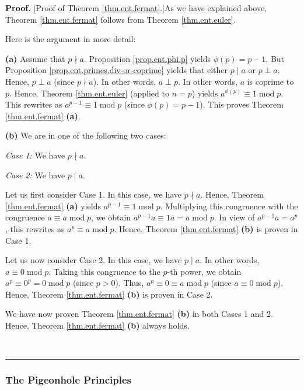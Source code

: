 \documentclass[numbers=enddot,12pt,final,onecolumn,notitlepage]{scrartcl}%
\numberwithin{exer}{subsection}
\theoremstyle{definition}
\newenvironment{fineprint}{\begin{small}}{\end{small}}
\newenvironment{proof}[1][Proof]{\noindent\textbf{#1.} }{\ \rule{0.5em}{0.5em}}
\begin{document}
\begin{proof}
[Proof of Theorem \ref{thm.ent.fermat}.]As we have explained above, Theorem
\ref{thm.ent.fermat} follows from Theorem \ref{thm.ent.euler}.

\begin{fineprint}
Here is the argument in more detail:

\textbf{(a)} Assume that $p\nmid a$. Proposition \ref{prop.ent.phi.p} yields
$\phi\left(  p\right)  =p-1$. But Proposition
\ref{prop.ent.primes.div-or-coprime} yields that either $p\mid a$ or $p\perp
a$. Hence, $p\perp a$ (since $p\nmid a$). In other words, $a\perp p$. In other
words, $a$ is coprime to $p$. Hence, Theorem \ref{thm.ent.euler} (applied to
$n=p$) yields $a^{\phi\left(  p\right)  }\equiv1\operatorname{mod}p$. This
rewrites as $a^{p-1}\equiv1\operatorname{mod}p$ (since $\phi\left(  p\right)
=p-1$). This proves Theorem \ref{thm.ent.fermat} \textbf{(a)}.

\textbf{(b)} We are in one of the following two cases:

\textit{Case 1:} We have $p\nmid a$.

\textit{Case 2:} We have $p\mid a$.

Let us first consider Case 1. In this case, we have $p\nmid a$. Hence, Theorem
\ref{thm.ent.fermat} \textbf{(a)} yields $a^{p-1}\equiv1\operatorname{mod}p$.
Multiplying this congruence with the congruence $a\equiv a\operatorname{mod}%
p$, we obtain $a^{p-1}a\equiv1a=a\operatorname{mod}p$. In view of
$a^{p-1}a=a^{p}$, this rewrites as $a^{p}\equiv a\operatorname{mod}p$. Hence,
Theorem \ref{thm.ent.fermat} \textbf{(b)} is proven in Case 1.

Let us now consider Case 2. In this case, we have $p\mid a$. In other words,
$a\equiv0\operatorname{mod}p$. Taking this congruence to the $p$-th power, we
obtain $a^{p}\equiv0^{p}=0\operatorname{mod}p$ (since $p>0$). Thus,
$a^{p}\equiv0\equiv a\operatorname{mod}p$ (since $a\equiv0\operatorname{mod}%
p$). Hence, Theorem \ref{thm.ent.fermat} \textbf{(b)} is proven in Case 2.

We have now proven Theorem \ref{thm.ent.fermat} \textbf{(b)} in both Cases 1
and 2. Hence, Theorem \ref{thm.ent.fermat} \textbf{(b)} always holds.
\end{fineprint}
\end{proof}

\subsubsection{The Pigeonhole Principles}
\end{document}
